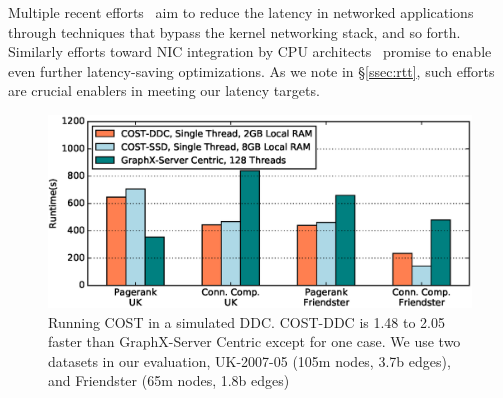 
Multiple recent efforts~\cite{farm,mica,herd,ramcloud} aim to reduce the latency in networked applications through techniques that bypass the kernel networking stack, and so forth. %
Similarly efforts toward NIC integration by CPU architects~\cite{cpu-nic} promise to enable even further latency-saving optimizations. As we note in \S\ref{ssec:rtt}, such efforts are crucial enablers in meeting our latency targets. 










\begin{figure}
  \centering
    \includegraphics[width = \columnwidth]{img/benefit_uk.eps} 
  \caption{\small{Running COST in a simulated DDC. COST-DDC is 1.48 to 2.05 faster than GraphX-Server Centric except for one case. We use two datasets in our evaluation, UK-2007-05 (105m nodes, 3.7b edges), and Friendster (65m nodes, 1.8b edges)}}
  \label{fig:benefit}
\end{figure}







